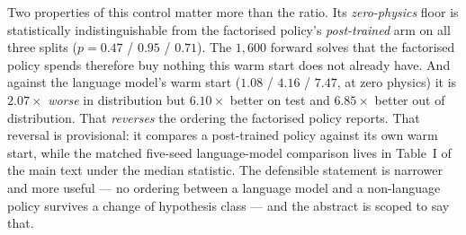 Two properties of this control matter more than the ratio. Its \emph{zero-physics} floor is statistically indistinguishable from the
factorised policy's \emph{post-trained} arm on all three splits ($p=0.47$ / $0.95$ /
$0.71$).  The $1{,}600$ forward solves that the factorised policy spends therefore buy nothing this warm start
does not already have. And against the language model's warm start ($1.08$ / $4.16$ / $7.47$, at zero
physics) it is $2.07\times$ \emph{worse} in distribution but $6.10\times$ better on
test and $6.85\times$ better out of distribution.  That \emph{reverses} the ordering
the factorised policy reports.  That reversal is provisional:
 it compares a post-trained policy against its own warm start, while the matched
five-seed language-model comparison lives in Table~I of the main text under the median statistic. The defensible statement is
narrower and more useful --- no ordering between a language model and a non-language
policy survives a change of hypothesis class --- and the abstract is scoped to say that.

